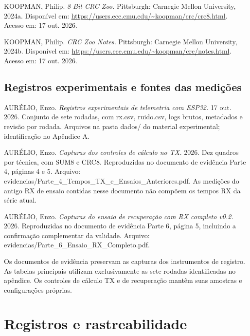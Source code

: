 \documentclass[12pt,a4paper]{article}
\begin{document}
\begingroup\setlength{\parindent}{0pt}\small KOOPMAN, Philip. \emph{8 Bit CRC Zoo.} Pittsburgh: Carnegie Mellon University, 2024a. Disponível em: \url{https://users.ece.cmu.edu/~koopman/crc/crc8.html}. Acesso em: 17 out. 2026.\par\endgroup

\begingroup\setlength{\parindent}{0pt}\small KOOPMAN, Philip. \emph{CRC Zoo Notes.} Pittsburgh: Carnegie Mellon University, 2024b. Disponível em: \url{https://users.ece.cmu.edu/~koopman/crc/notes.html}. Acesso em: 17 out. 2026.\par\endgroup

\subsection*{Registros experimentais e fontes das medições}
\begingroup\setlength{\parindent}{0pt}\small AURÉLIO, Enzo. \emph{Registros experimentais de telemetria com ESP32.} 17 out. 2026. Conjunto de sete rodadas, com rx.csv, ruido.csv, logs brutos, metadados e revisão por rodada. Arquivos na pasta dados/ do material experimental; identificação no Apêndice A.\par\endgroup

\begingroup\setlength{\parindent}{0pt}\small AURÉLIO, Enzo. \emph{Capturas dos controles de cálculo no TX.} 2026. Dez quadros por técnica, com SUM8 e CRC8. Reproduzidas no documento de evidência Parte 4, páginas 4 e 5. Arquivo: evidencias/Parte\_4\_Tempos\_TX\_e\_Ensaios\_Anteriores.pdf. As medições do antigo RX de ensaio contidas nesse documento não compõem os tempos RX da série atual.\par\endgroup

\begingroup\setlength{\parindent}{0pt}\small AURÉLIO, Enzo. \emph{Capturas do ensaio de recuperação com RX completo v0.2.} 2026. Reproduzidas no documento de evidência Parte 6, página 5, incluindo a confirmação complementar da validade. Arquivo: evidencias/Parte\_6\_Ensaio\_RX\_Completo.pdf.\par\endgroup

Os documentos de evidência preservam as capturas dos instrumentos de registro. As tabelas principais utilizam exclusivamente as sete rodadas identificadas no apêndice. Os controles de cálculo TX e de recuperação mantêm suas amostras e configurações próprias.

\FloatBarrier\clearpage\appendix\section{Registros e rastreabilidade}\setcounter{table}{0}
\end{document}
